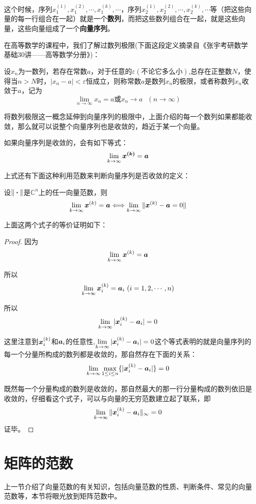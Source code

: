\documentclass[12pt, a4paper, oneside, UTF8]{ctexbook}
\begin{document}
这个时候，序列$x_1^{(1)},x_1^{(2)},\cdots,x_1^{(k)},\cdots$，序列$x_2^{(1)},x_2^{(2)},\cdots,x_2^{(k)},\cdots$等（把这些向量的每一行组合在一起）就是一个\textbf{数列}，而把这些数列组合在一起，就是这些向量，这些向量组成了一个\textbf{向量序列}。

在高等数学的课程中，我们了解过数列极限(下面这段定义摘录自《张宇考研数学基础30讲——高等数学分册》)：

设${x_n}$为一数列，若存在常数$a$，对于任意的$\varepsilon(\text{不论它多么小})$,总存在正整数$N$，使得当$n>N$时，$|x_n-a|<\varepsilon$恒成立，则称常数$a$是数列${x_n}$的极限，或者称数列${x_n}$收敛于$a$，记为\[\lim\limits_{n\to\infty}x_n=a \text{或}x_n\to a\ \ \ (n\to\infty)\]

将数列极限这一概念延伸到向量序列的极限中，上面介绍的每一个数列如果都能收敛，那么就可以说整个向量序列也是收敛的，趋近于某一个向量。

如果向量序列是收敛的，会有如下等式：
\[\lim\limits_{k\to\infty}\boldsymbol{x^{(k)}}=\boldsymbol{a}\]

上式还有下面这种利用范数来判断向量序列是否收敛的定义：
\begin{them}{}{}
    设$\Vert\boldsymbol{\cdot}\Vert$是$\mathbb{C}^n$上的任一向量范数，则\[\lim\limits_{k\to\infty}\boldsymbol{x}^{(k)}=\boldsymbol{a}\Longleftrightarrow \lim\limits_{k\to\infty}\Vert \boldsymbol{x}^{(k)}-\boldsymbol{a}=0\Vert\]

\end{them}

上面这两个式子的等价证明如下：

\begin{proof}

    因为\[\lim\limits_{k\to\infty}\boldsymbol{x}^{(k)}=\boldsymbol{a}\]

    所以\[\lim\limits_{k\to\infty}\bs{x}^{(k)}_i=\bs{a}_i\ (i=1,2,\cdots,n)\]

    所以\[\lim\limits_{k\to\infty}|\boldsymbol{x}^{(k)}_i-\boldsymbol{a}_i|=0\]

    这里注意到$\boldsymbol{x}_i^{(k)}$和$\boldsymbol{a}_i$的任意性,$\lim\limits_{k\to\infty}|\boldsymbol{x}^{(k)}_i-\boldsymbol{a}_i|=0$这个等式表明的就是向量序列的每一个分量所构成的数列都是收敛的，那自然存在下面的关系：
    \[\lim\limits_{k\to\infty}\max\limits_{1\leq i\leq n}\{|\boldsymbol{x}_i^{(k)}-\boldsymbol{a}_i|\}=0\]
    
    既然每一个分量构成的数列是收敛的，那自然最大的那一行分量构成的数列依旧是收敛的，仔细看这个式子，可以与向量的无穷范数建立起了联系，即\[\lim\limits_{k\to\infty}\Vert\boldsymbol{x}_i^{(k)}-\boldsymbol{a}_i\Vert_{\infty}=0\]
    证毕。
\end{proof}
\section{矩阵的范数}
上一节介绍了向量范数的有关知识，包括向量范数的性质、判断条件、常见的向量范数等，本节将眼光放到矩阵范数中。
\end{document}
